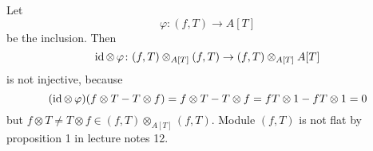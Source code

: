 \begin{exercise}{4}
    Let
    \begin{equation}
        \varphi \colon (f, T) \rightarrow A[T]
    \end{equation}
    be the inclusion. Then
    \begin{equation}
        \operatorname{id} \otimes\,\varphi \colon (f, T) \otimes_{A[T]} (f, T) \rightarrow (f,
        T) \otimes_{A[T]} A[T]
    \end{equation}
    is not injective, because
    \begin{equation}
        (\operatorname{id} \otimes\,\varphi)(f \otimes T - T \otimes f) = f \otimes T - T \otimes f = fT \otimes
        1 - fT \otimes 1 = 0
    \end{equation}
    but $f \otimes T \not= T \otimes f \in (f, T) \otimes_{A[T]} (f, T)$.
    Module $(f, T)$ is not flat by proposition 1 in lecture notes 12.
\end{exercise}


